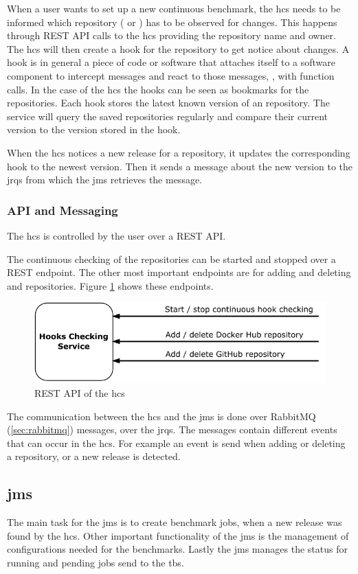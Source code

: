 When a user wants to set up a new continuous benchmark, the \ac{hcs} needs to be informed which repository (\gh{} or \dockh{}) has to be observed for changes.
This happens through REST API calls to the \ac{hcs} providing the repository name and owner.
The \ac{hcs} will then create a hook for the repository to get notice about changes.
A hook is in general a piece of code or software that attaches itself to a software component to intercept messages and react to those messages, \eg, with function calls.
In the case of the \ac{hcs} the hooks can be seen as bookmarks for the repositories.
Each hook stores the latest known version of an repository.
The service will query the saved repositories regularly and compare their current version to the version stored in the hook.

When the \ac{hcs} notices a new release for a repository, it updates the corresponding hook to the newest version.
Then it sends a message about the new version to the \aclp{jrq} from which the \acl{jms} retrieves the message.

\subsubsection{API and Messaging}
\label{sec:hooks_api}
The \ac{hcs} is controlled by the user over a REST API.

The continuous checking of the repositories can be started and stopped over a REST endpoint.
The other most important endpoints are for adding and deleting \gh{} and \dockh{} repositories.
Figure \ref{fig:rest_apis_approach_hcs} shows these endpoints.
\begin{figure}[tbph]
	\centering
	\includegraphics[width=.57\textwidth]{figures/rest-apis-approach-hcs.pdf}
	\caption{REST API of the \acl{hcs}}
	\label{fig:rest_apis_approach_hcs}
\end{figure}

The communication between the \ac{hcs} and the \acl{jms} is done over RabbitMQ (\ref{sec:rabbitmq}) messages, over the \aclp{jrq}.
The messages contain different events that can occur in the \ac{hcs}.
For example an event is send when adding or deleting a repository, or a new release is detected.


\subsection{\acl{jms}}
\label{sec:jobs_managing_service}
The main task for the \acf{jms} is to create benchmark jobs, when a new release was found by the \ac{hcs}.
Other important functionality of the \ac{jms} is the management of configurations needed for the benchmarks.
Lastly the \ac{jms} manages the status for running and pending jobs send to the \acl{tbs}.
\\

